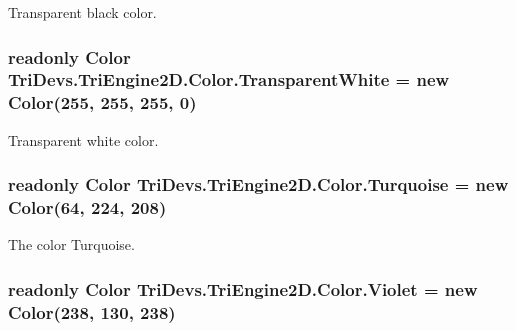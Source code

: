 Transparent black color. 

\hypertarget{struct_tri_devs_1_1_tri_engine2_d_1_1_color_ab807ae74612c7561f4408b976180de37}{
\subsubsection[{Transparent\-White}]{\setlength{\rightskip}{0pt plus 5cm}readonly {\bf Color} Tri\-Devs.\-Tri\-Engine2\-D.\-Color.\-Transparent\-White = new {\bf Color}(255, 255, 255, 0)\hspace{0.3cm}{\ttfamily [static]}}}\label{struct_tri_devs_1_1_tri_engine2_d_1_1_color_ab807ae74612c7561f4408b976180de37}


Transparent white color. 

\hypertarget{struct_tri_devs_1_1_tri_engine2_d_1_1_color_af03f9d498682c9772382aab3be5c40e9}{
\subsubsection[{Turquoise}]{\setlength{\rightskip}{0pt plus 5cm}readonly {\bf Color} Tri\-Devs.\-Tri\-Engine2\-D.\-Color.\-Turquoise = new {\bf Color}(64, 224, 208)\hspace{0.3cm}{\ttfamily [static]}}}\label{struct_tri_devs_1_1_tri_engine2_d_1_1_color_af03f9d498682c9772382aab3be5c40e9}


The color Turquoise. 

\hypertarget{struct_tri_devs_1_1_tri_engine2_d_1_1_color_a99717ebc17b83d156d0e43e07ca4845f}{
\subsubsection[{Violet}]{\setlength{\rightskip}{0pt plus 5cm}readonly {\bf Color} Tri\-Devs.\-Tri\-Engine2\-D.\-Color.\-Violet = new {\bf Color}(238, 130, 238)\hspace{0.3cm}{\ttfamily [static]}}}\label{struct_tri_devs_1_1_tri_engine2_d_1_1_color_a99717ebc17b83d156d0e43e07ca4845f}


